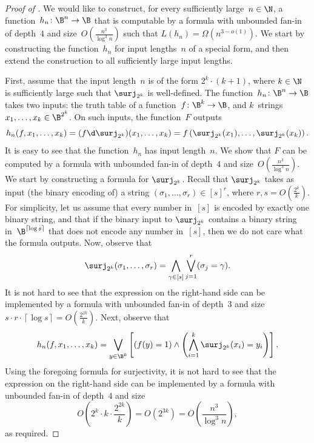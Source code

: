 \begin{proof}[Proof of ]
We would like to construct, for every sufficiently large~$n\in\N$,
a function~$h_{n}\colon\B^{n}\to\B$ that is computable by a formula
with unbounded fan-in of depth~$4$ and size~$O(\frac{n^{3}}{\log^{3}n})$
such that $L(h_{n})=\Omega(n^{3-o(1)})$. We start by constructing
the function~$h_{n}$ for input lengths~$n$ of a special form,
and then extend the construction to all sufficiently large input lengths.

First, assume that the input length~$n$ is of the form $2^{k}\cdot(k+1)$,
where $k\in\N$ is sufficiently large such that $\surj_{2^{k}}$ is
well-defined. The function~$h_{n}\colon\B^{n}\to\B$ takes two inputs:
the truth table of a function~$f\colon\B^{k}\to\B$, and $k$~strings
$x_{1},\ldots,x_{k}\in\B^{2^{k}}$. On such inputs, the function~$F$
outputs 
\[
h_{n}(f,x_{1},\ldots,x_{k})=(f\d\surj_{2^{k}})(x_{1},\ldots,x_{k})=f\left(\surj_{2^{k}}(x_{1}),\ldots,\surj_{2^{k}}(x_{k})\right).
\]
It is easy to see that the function~$h_{n}$ has input length~$n$.
We show that $F$ can be computed by a formula with unbounded fan-in
of depth~$4$ and size~$O(\frac{n^{3}}{\log^{3}n})$. We start by
constructing a formula for $\surj_{2^{k}}$. Recall that $\surj_{2^{k}}$
takes as input (the binary encoding of) a string $(\sigma_{1},\ldots,\sigma_{r})\in\left[s\right]^{r}$,
where $r,s=O(\frac{2^{k}}{k})$. For simplicity, let us assume that
every number in~$\left[s\right]$ is encoded by exactly one binary
string, and that if the binary input to $\surj_{2^{k}}$ contains
a binary string in~$\B^{\left\lceil \log s\right\rceil }$ that does
not encode any number in~$\left[s\right]$, then we do not care what
the formula outputs. Now, observe that 
\begin{equation}
\surj_{2^{k}}(\sigma_{1},\ldots,\sigma_{r})=\bigwedge_{\gamma\in\left[s\right]}\bigvee_{j=1}^{r}(\sigma_{j}=\gamma).\label{eq:surjectivity-formula}
\end{equation}
It is not hard to see that the expression on the right-hand side can
be implemented by a formula with unbounded fan-in of depth~$3$ and
size $s\cdot r\cdot\left\lceil \log s\right\rceil =O\!\left(\frac{2^{2k}}{k}\right)$.
Next, observe that 
\[
h_{n}(f,x_{1},\ldots,x_{k})=\bigvee_{y\in\B^{k}}\left[\left(f(y)=1\right)\wedge\left(\bigwedge_{i=1}^{k}\surj_{2^{k}}(x_{i})=y_{i}\right)\right].
\]
Using the foregoing formula for surjectivity, it is not hard to see
that the expression on the right-hand side can be implemented by a
formula with unbounded fan-in of depth~$4$ and size 
\[
O\!\left(2^{k}\cdot k\cdot\frac{2^{2k}}{k}\right)=O\!\left(2^{3k}\right)=O\!\left(\frac{n^{3}}{\log^{3}n}\right),
\]
as required.


\end{proof}
